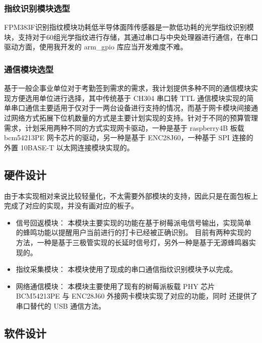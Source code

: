 \subsubsection{指纹识别模块选型}

FPM383F识别指纹模块功耗低半导体面阵传感器是一款低功耗的光学指纹识别模块，支持对于60组光学指纹进行存储，其通过串口与中央处理器进行通信，在串口驱动方面，使用我开发的 arm\_gpio 库应当开发难度不难。

\subsubsection{通信模块选型}

基于一般企事业单位对于考勤签到需求的需求，我计划提供多种不同的通信模块实现方便选用单位进行选择，其中传统基于 CH304 串口转 TTL 通信模块实现的简单串口通信主要适用于仅对于一两台设备进行支持的情况，而基于网卡模块间接通过网络方式拓展下位机数量的方式是主要计划实现的支持。针对于不同的预算管理需求，计划采用两种不同的方式实现网卡驱动，一种是基于 raspberry4B 板载 bcm54213PE 网卡芯片的驱动，另一种是基于 ENC28J60，一种基于 SPI 连接的外置 10BASE-T 以太网连接模块实现的。

\subsection{硬件设计}

    由于本实现相对来说比较轻量化，不太需要外部模块的支持，因此只是在面包板上完成了对应的实现，并没有画对应的板子。

    \begin{itemize}
        \item 信号回返模块：
            本模块主要实现的功能在基于树莓派电信号输出，实现简单的蜂鸣功能以提醒用户当前进行的打卡已经被正确识别。
            目前有两种实现的方法，一种是基于三极管实现的长延时信号灯，另外一种是基于无源蜂鸣器实现的。
        \item 指纹采集模块：
            本模块使用了现成的串口通信指纹识别模块予以完成。
        \item 网络通信模块：
            本模块主要使用了现有的树莓派板载 PHY 芯片 BCM54213PE 与 ENC28J60 外接网卡模块实现了对应的功能，同时
            还提供了串口替代的 USB 通信方法。
    \end{itemize}

\subsection{软件设计}

